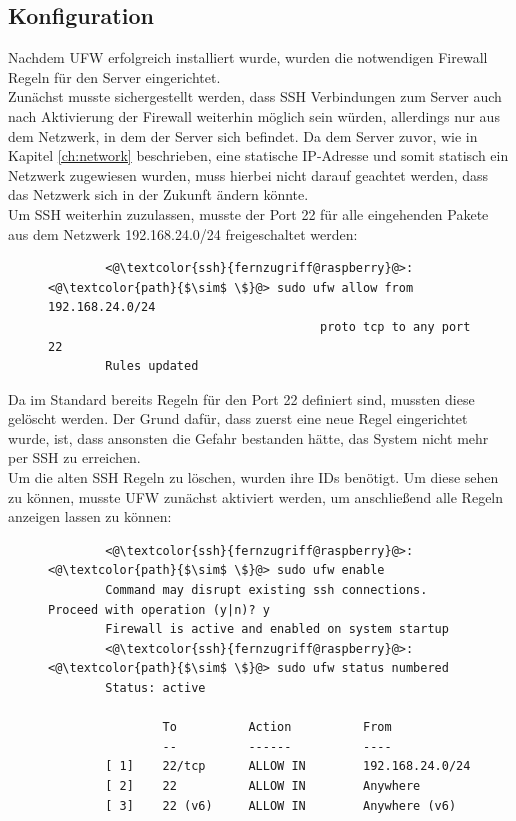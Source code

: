 \documentclass[a4paper, 11pt]{scrartcl}
\begin{document}
\subsection{Konfiguration}\label{ch:firewall_config}
Nachdem UFW erfolgreich installiert wurde, wurden die notwendigen Firewall Regeln für den Server eingerichtet.
\\
Zunächst musste sichergestellt werden, dass SSH Verbindungen zum Server auch nach Aktivierung der Firewall weiterhin möglich sein würden, allerdings nur aus dem Netzwerk, in dem der
Server sich befindet. Da dem Server zuvor, wie in Kapitel \ref{ch:network} beschrieben, eine statische IP-Adresse und somit statisch ein Netzwerk zugewiesen wurden, muss hierbei
nicht darauf geachtet werden, dass das Netzwerk sich in der Zukunft ändern könnte.
\\
Um SSH weiterhin zuzulassen, musste der Port 22 für alle eingehenden Pakete aus dem Netzwerk 192.168.24.0/24 freigeschaltet
werden:
\begin{figure}[H]
    \begin{mdframed}[backgroundcolor=bbg]
        \begin{lstlisting}
        <@\textcolor{ssh}{fernzugriff@raspberry}@>:<@\textcolor{path}{$\sim$ \$}@> sudo ufw allow from 192.168.24.0/24 
                                      proto tcp to any port 22
        Rules updated
        \end{lstlisting}
    \end{mdframed}
    \label{lst:allow_ssh_from_network}
\end{figure}
Da im Standard bereits Regeln für den Port 22 definiert sind, mussten diese gelöscht werden. Der Grund dafür, dass zuerst eine neue Regel eingerichtet wurde, ist,
dass ansonsten die Gefahr bestanden hätte, das System nicht mehr per SSH zu erreichen.
\\
Um die alten SSH Regeln zu löschen, wurden ihre IDs benötigt. Um diese sehen zu können, musste UFW zunächst aktiviert werden, um anschließend alle Regeln anzeigen lassen
zu können:
\begin{figure}[H]
    \begin{mdframed}[backgroundcolor=bbg]
        \begin{lstlisting}
        <@\textcolor{ssh}{fernzugriff@raspberry}@>:<@\textcolor{path}{$\sim$ \$}@> sudo ufw enable
        Command may disrupt existing ssh connections. Proceed with operation (y|n)? y
        Firewall is active and enabled on system startup
        <@\textcolor{ssh}{fernzugriff@raspberry}@>:<@\textcolor{path}{$\sim$ \$}@> sudo ufw status numbered
        Status: active

                To          Action          From
                --          ------          ----
        [ 1]    22/tcp      ALLOW IN        192.168.24.0/24
        [ 2]    22          ALLOW IN        Anywhere
        [ 3]    22 (v6)     ALLOW IN        Anywhere (v6)
        \end{lstlisting}
    \end{mdframed}
    \label{lst:ufw_enable_status}
\end{figure}
\end{document}
